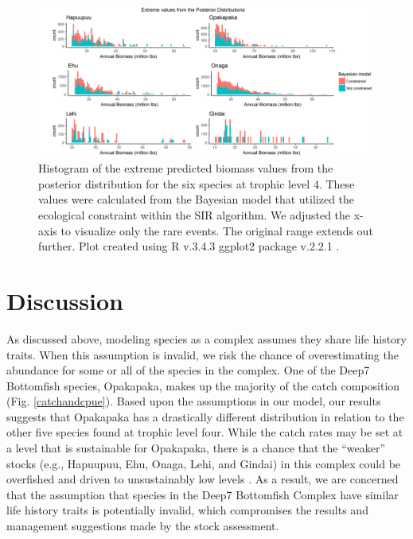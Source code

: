 \documentclass[oneside,12pt,final]{sty/ucthesis-CA2012}
\let\cite\citep                             %
\begin{document}
\begin{mainmatter}
\begin{figure}[H]
     \centering
       \includegraphics[width=\textwidth]{fig/post_ext}
    \caption{Histogram of the extreme predicted biomass values from the posterior distribution for the six species at trophic level 4. These values were calculated from the Bayesian model that utilized the ecological constraint within the SIR algorithm. We adjusted the x-axis to visualize only the rare events. The original range extends out further. Plot created using R v.3.4.3 \cite{Rcite} ggplot2 package v.2.2.1 \cite{ggplot}.}
    \label{postext}
\end{figure}


\section*{Discussion}
As discussed above, modeling species as a complex assumes they share life history traits. When this assumption is invalid, we risk the chance of overestimating the abundance for some or all of the species in the complex. One of the Deep7 Bottomfish species, Opakapaka, makes up the majority of the catch composition (Fig. \ref{catchandcpue}). Based upon the assumptions in our model, our results suggests that Opakapaka has a drastically different distribution in relation to the other five species found at trophic level four. While the catch rates may be set at a level that is sustainable for Opakapaka, there is a chance that the ``weaker” stocks (e.g., Hapuupuu, Ehu, Onaga, Lehi, and Gindai) in this complex could be overfished and driven to unsustainably low levels \cite{hastings2017marine}. As a result, we are concerned that the assumption that species in the Deep7 Bottomfish Complex have similar life history traits is potentially invalid, which compromises the results and management suggestions made by the stock assessment.

\vspace{5mm}


\end{mainmatter}
\end{document}
